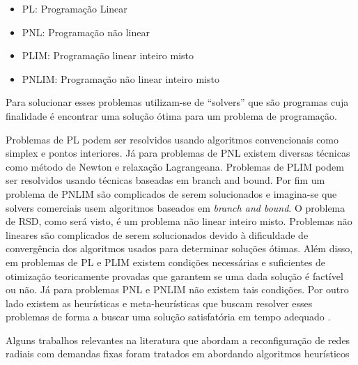 \begin{itemize}
    \item PL: Programação Linear
    
    \item PNL: Programação não linear
    
    \item PLIM: Programação linear inteiro misto
    
    \item PNLIM: Programação não linear inteiro misto
\end{itemize}

Para solucionar esses problemas utilizam-se de ``solvers'' que são programas cuja finalidade é encontrar uma solução ótima para um problema de programação.

Problemas de PL podem ser resolvidos usando algoritmos convencionais como simplex e pontos interiores.
Já para problemas de PNL existem diversas técnicas como método de Newton e relaxação Lagrangeana.
Problemas de PLIM podem ser resolvidos usando técnicas baseadas em branch and bound.
Por fim um problema de PNLIM são complicados de serem solucionados e imagina-se que solvers comerciais usem algoritmos baseados em \emph{branch and bound}. %
O problema de RSD, como será visto, é um problema não linear inteiro misto.
Problemas não lineares são complicados de serem solucionados devido à dificuldade de convergência dos algoritmos usados para determinar soluções ótimas. %
Além disso, em problemas de PL e PLIM existem condições necessárias e suficientes de otimização teoricamente provadas que garantem se uma dada solução é factível ou não.
Já para problemas PNL e PNLIM não existem tais condições. Por outro lado existem as heurísticas e meta-heurísticas que buscam resolver esses problemas de forma a buscar uma solução satisfatória em tempo adequado \cite{Goncalves2013ModelosRadiais}.  

Alguns trabalhos relevantes na literatura que abordam a reconfiguração de redes radiais com demandas fixas foram tratados em \cite{Baran1989NetworkBalancing } abordando algoritmos heurísticos%


